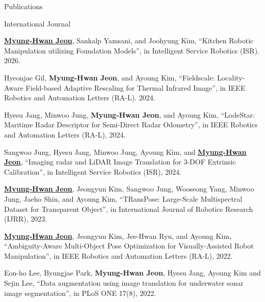 \begin{rSection}{Publications}



\begin{pubSubsection}{International Journal}

  \item \underline{\textbf{Myung-Hwan Jeon}}, Sankalp Yamsani, and Joohyung Kim, “Kitchen Robotic Manipulation utilizing Foundation Models”, in Intelligent Service Robotics (ISR). 2026. %

  \item Hyeonjae Gil, \textbf{Myung-Hwan Jeon}, and Ayoung Kim, “Fieldscale: Locality-Aware Field-based Adaptive Rescaling for Thermal Infrared Image”, in IEEE Robotics and Automation Letters (RA-L). 2024. %

  \item Hyesu Jang, Minwoo Jung, \textbf{Myung-Hwan Jeon}, and Ayoung Kim, “LodeStar: Maritime Radar Descriptor for Semi-Direct Radar Odometry”, in IEEE Robotics and Automation Letters (RA-L), 2024.%
  
  \item Sangwoo Jung, Hyesu Jang, Minwoo Jung, Ayoung Kim, and \underline{\textbf{Myung-Hwan Jeon}}, “Imaging radar and LiDAR Image Translation for 3-DOF Extrinsic Calibration”, in Intelligent Service Robotics (ISR), 2024.%

  \item \underline{\textbf{Myung-Hwan Jeon}}, Jeongyun Kim, Sangwoo Jung, Wooseong Yang, Minwoo Jung, Jaeho Shin, and Ayoung Kim, “TRansPose: Large-Scale Multispectral Dataset for Transparent Object”, in International Journal of Robotics Research (IJRR), 2023.%

  \item \underline{\textbf{Myung-Hwan Jeon}}, Jeongyun Kim, Jee-Hwan Ryu, and Ayoung Kim, “Ambiguity-Aware Multi-Object Pose Optimization for Visually-Assisted Robot Manipulation”, in IEEE Robotics and Automation Letters (RA-L), 2022.%
  
  \item Eon-ho Lee, Byungjae Park, \textbf{Myung-Hwan Jeon}, Hyesu Jang, Ayoung Kim and Sejin Lee, “Data augmentation using image translation for underwater sonar image segmentation”, in PLoS ONE 17(8), 2022.%
  

\end{pubSubsection}
\end{rSection}
